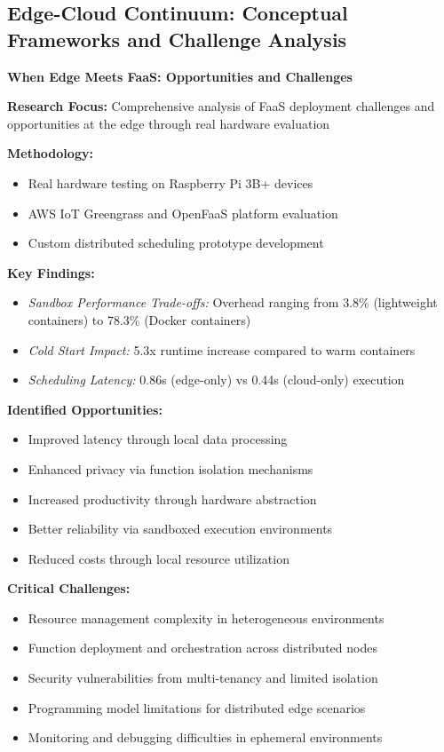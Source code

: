 \subsection{Edge-Cloud Continuum: Conceptual Frameworks and Challenge Analysis}

\noindent
\begin{minipage}{\textwidth}
\textbf{\large When Edge Meets FaaS: Opportunities and Challenges} \cite{jin2019when}

\textbf{Research Focus:} Comprehensive analysis of FaaS deployment challenges and opportunities at the edge through real hardware evaluation

\textbf{Methodology:}
\begin{itemize}
    \item Real hardware testing on Raspberry Pi 3B+ devices
    \item AWS IoT Greengrass and OpenFaaS platform evaluation
    \item Custom distributed scheduling prototype development
\end{itemize}

\textbf{Key Findings:}
\begin{itemize}
    \item \textit{Sandbox Performance Trade-offs:} Overhead ranging from 3.8\% (lightweight containers) to 78.3\% (Docker containers)
    \item \textit{Cold Start Impact:} 5.3x runtime increase compared to warm containers
    \item \textit{Scheduling Latency:} 0.86s (edge-only) vs 0.44s (cloud-only) execution
\end{itemize}

\textbf{Identified Opportunities:}
\begin{itemize}
    \item Improved latency through local data processing
    \item Enhanced privacy via function isolation mechanisms
    \item Increased productivity through hardware abstraction
    \item Better reliability via sandboxed execution environments
    \item Reduced costs through local resource utilization
\end{itemize}

\textbf{Critical Challenges:}
\begin{itemize}
    \item Resource management complexity in heterogeneous environments
    \item Function deployment and orchestration across distributed nodes
    \item Security vulnerabilities from multi-tenancy and limited isolation
    \item Programming model limitations for distributed edge scenarios
    \item Monitoring and debugging difficulties in ephemeral environments
\end{itemize}
\end{minipage}

